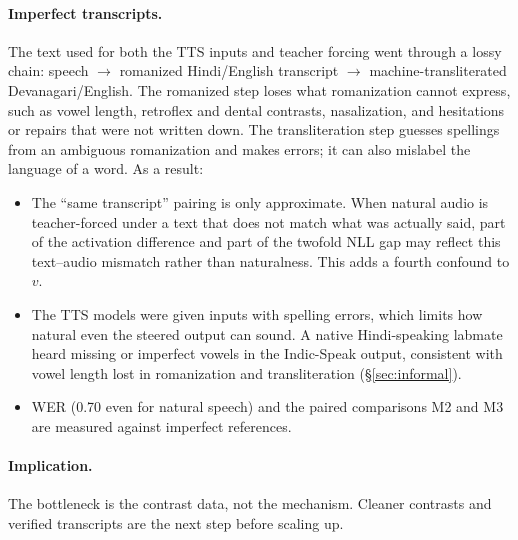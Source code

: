 \documentclass[11pt]{article}
\begin{document}
\paragraph{Imperfect transcripts.}\label{sec:transcripts} The text used for both the TTS inputs and teacher forcing went through a lossy chain: speech $\to$ romanized Hindi/English transcript $\to$ machine-transliterated Devanagari/English. The romanized step loses what romanization cannot express, such as vowel length, retroflex and dental contrasts, nasalization, and hesitations or repairs that were not written down. The transliteration step guesses spellings from an ambiguous romanization and makes errors; it can also mislabel the language of a word. As a result:
\begin{itemize}
\item The ``same transcript'' pairing is only approximate. When natural audio is teacher-forced under a text that does not match what was actually said, part of the activation difference and part of the twofold NLL gap may reflect this text--audio mismatch rather than naturalness. This adds a fourth confound to $v$.
\item The TTS models were given inputs with spelling errors, which limits how natural even the steered output can sound. A native Hindi-speaking labmate heard missing or imperfect vowels in the Indic-Speak output, consistent with vowel length lost in romanization and transliteration (\S\ref{sec:informal}).
\item WER (0.70 even for natural speech) and the paired comparisons M2 and M3 are measured against imperfect references.
\end{itemize}

\paragraph{Implication.} The bottleneck is the contrast data, not the mechanism. Cleaner contrasts and verified transcripts are the next step before scaling up.
\end{document}
